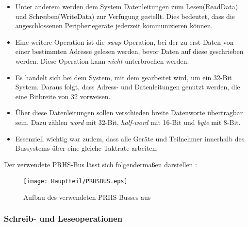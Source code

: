 \begin{itemize}
  \item Unter anderem werden dem System Datenleitungen zum Lesen(ReadData) und Schreiben(WriteData) zur Verfügung gestellt.
  Dies bedeutet, dass die angeschlossenen Peripheriegeräte jederzeit kommunizieren können.
  \item Eine weitere Operation ist die \emph{swap}-Operation, bei der zu erst Daten von einer bestimmten Adresse
        gelesen werden, bevor Daten auf diese geschrieben werden. Diese Operation kann \emph{nicht} unterbrochen werden.
  \item Es handelt sich bei dem System, mit dem gearbeitet wird, um ein 32-Bit System. Daraus folgt, dass
        Adress- und Datenleitungen genutzt werden, die eine Bitbreite von 32 vorweisen.
  \item Über diese Datenleitungen sollen verschieden breite Datenworte übertragbar sein. Dazu zählen \emph{word} mit
        32-Bit, \emph{half-word} mit 16-Bit und \emph{byte} mit 8-Bit.
  \item Essenziell wichtig war zudem, dass alle Geräte und Teilnehmer innerhalb des Bussystems über eine gleiche
  Taktrate arbeiten.
\end{itemize}




Der verwendete PRHS-Bus lässt sich folgendermaßen darstellen \cite{MEckertDiss}:

\begin{figure}[h]
\centering
\texttt{[image: Hauptteil/PRHSBUS.eps]}
\caption{Aufbau des verwendeten PRHS-Busses aus \cite{ME}}
\label{fig:PRHSBUS}
\end{figure}


\subsubsection{Schreib- und Leseoperationen}\label{operations}

